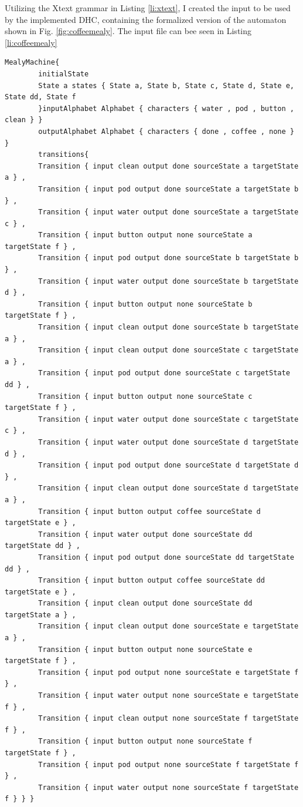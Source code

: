 Utilizing the Xtext grammar in Listing \ref{li:xtext}, I created the input to be used by the implemented DHC, containing the formalized version of the automaton shown in Fig. \ref{fig:coffeemealy}. The input file can bee seen in Listing \ref{li:coffeemealy}


\begin{lstlisting}[caption=The Mealy machine seen in Fig.\ref{fig:coffeemealy} in the form of the Xtext the grammar described in Listing \ref{li:xtext}.,label=li:coffeemealy]
	MealyMachine{
		initialState 
		State a states { State a, State b, State c, State d, State e, State dd, State f
		}inputAlphabet Alphabet { characters { water , pod , button , clean } }
		outputAlphabet Alphabet { characters { done , coffee , none } }
		transitions{ 
		Transition { input clean output done sourceState a targetState a } , 
		Transition { input pod output done sourceState a targetState b } , 
		Transition { input water output done sourceState a targetState c } , 
		Transition { input button output none sourceState a targetState f } , 
		Transition { input pod output done sourceState b targetState b } , 
		Transition { input water output done sourceState b targetState d } , 
		Transition { input button output none sourceState b targetState f } , 
		Transition { input clean output done sourceState b targetState a } , 
		Transition { input clean output done sourceState c targetState a } , 
		Transition { input pod output done sourceState c targetState dd } , 
		Transition { input button output none sourceState c targetState f } , 
		Transition { input water output done sourceState c targetState c } , 
		Transition { input water output done sourceState d targetState d } , 
		Transition { input pod output done sourceState d targetState d } , 
		Transition { input clean output done sourceState d targetState a } , 
		Transition { input button output coffee sourceState d targetState e } , 
		Transition { input water output done sourceState dd targetState dd } , 
		Transition { input pod output done sourceState dd targetState dd } , 
		Transition { input button output coffee sourceState dd targetState e } , 
		Transition { input clean output done sourceState dd targetState a } , 
		Transition { input clean output done sourceState e targetState a } , 
		Transition { input button output none sourceState e targetState f } , 
		Transition { input pod output none sourceState e targetState f } , 
		Transition { input water output none sourceState e targetState f } , 
		Transition { input clean output none sourceState f targetState f } , 
		Transition { input button output none sourceState f targetState f } , 
		Transition { input pod output none sourceState f targetState f } , 
		Transition { input water output none sourceState f targetState f } } }
\end{lstlisting}